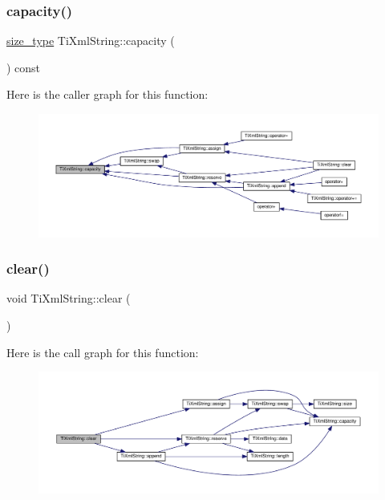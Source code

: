 \subsubsection{\texorpdfstring{capacity()}{capacity()}}
{\footnotesize\ttfamily \hyperlink{class_ti_xml_string_abeb2c1893a04c17904f7c06546d0b971}{size\+\_\+type} Ti\+Xml\+String\+::capacity (\begin{DoxyParamCaption}{ }\end{DoxyParamCaption}) const\hspace{0.3cm}{\ttfamily [inline]}}

Here is the caller graph for this function\+:\nopagebreak
\begin{figure}[H]
\begin{center}
\leavevmode
\includegraphics[width=350pt]{class_ti_xml_string_a0ca248f026e698f79b8aa4c9ab8e1571_icgraph}
\end{center}
\end{figure}
\mbox{\label{class_ti_xml_string_ab20e06e4c666abf3bdbfb3a1191d4888}} 
\subsubsection{\texorpdfstring{clear()}{clear()}}
{\footnotesize\ttfamily void Ti\+Xml\+String\+::clear (\begin{DoxyParamCaption}{ }\end{DoxyParamCaption})\hspace{0.3cm}{\ttfamily [inline]}}

Here is the call graph for this function\+:\nopagebreak
\begin{figure}[H]
\begin{center}
\leavevmode
\includegraphics[width=350pt]{class_ti_xml_string_ab20e06e4c666abf3bdbfb3a1191d4888_cgraph}
\end{center}
\end{figure}
\mbox{\label{class_ti_xml_string_a0e010e1737cfc3ee885b42875171b88e}} 

